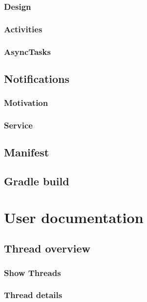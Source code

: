 \documentclass[11pt,a4paper,oneside]{report}
\begin{document}
\subsection{Design}

\subsection{Activities}

\subsection{AsyncTasks}

\section{Notifications}

\subsection{Motivation}

\subsection{Service}

\section{Manifest}

\section{Gradle build}

\chapter{User documentation}

\section{Thread overview}

\subsection{Show Threads}

\subsection{Thread details}
\end{document}
